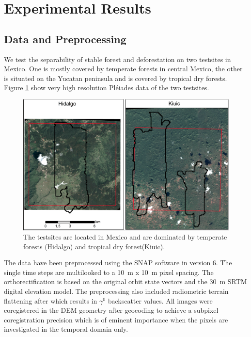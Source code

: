 \documentclass{article}
\begin{document}
\section{Experimental Results}
\subsection{Data and Preprocessing}
We test the separability of stable forest and deforestation on two testsites in Mexico.
One is mostly covered by temperate forests in central Mexico,
the other is situated on the Yucatan peninsula and is covered by tropical dry forests.
Figure \ref{testsites} show very high resolution Pléiades data of the two testsites.

\begin{figure}
  \includegraphics[width=\textwidth]{figs/SEN4REDD_testsites.png}
  \caption{The testsites are located in Mexico and are dominated by temperate forests (Hidalgo) and tropical dry forest(Kiuic).}
  \label{testsites}
\end{figure}

The data have been preprocessed using the SNAP software \cite{SNAP} in version 6.
The single time steps are multilooked to a \SI{10}{\m} x \SI{10}{\m} pixel spacing.
The orthorectification is based on the original orbit state vectors and the \SI{30}{\m} SRTM digital elevation model\cite{SRTM}.
The preprocessing also included radiometric terrain flattening after \cite{Small} which results in $\gamma^0$ backscatter values.
All images were coregistered in the DEM geometry after geocoding to achieve a subpixel coregistration precision which is of eminent importance when the pixels are investigated in the temporal domain only.
\end{document}
